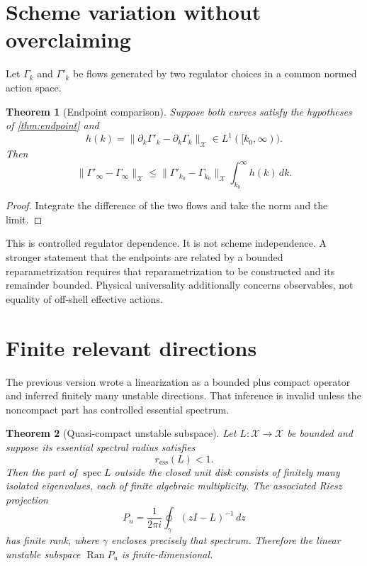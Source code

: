 \documentclass[11pt]{article}
\newtheorem{theorem}{Theorem}[section]
\theoremstyle{definition}
\theoremstyle{remark}
\newcommand{\X}{\mathcal X}
\newcommand{\Id}{I}
\newcommand{\spec}{\operatorname{spec}}
\newcommand{\Ran}{\operatorname{Ran}}
\begin{document}
\section{Scheme variation without overclaiming}

Let \(\Gamma_k\) and \(\Gamma'_k\) be flows generated by two regulator
choices in a common normed action space.

\begin{theorem}[Endpoint comparison]
\label{thm:scheme}
Suppose both curves satisfy the hypotheses of \autoref{thm:endpoint} and
\[
 h(k)=\|\partial_k\Gamma'_k-\partial_k\Gamma_k\|_{\X}
 \in L^1([k_0,\infty)).
\]
Then
\[
 \|\Gamma'_\infty-\Gamma_\infty\|_{\X}
 \leq
 \|\Gamma'_{k_0}-\Gamma_{k_0}\|_{\X}
 \int_{k_0}^\infty h(k)\,dk.
\]
\end{theorem}

\begin{proof}
Integrate the difference of the two flows and take the norm and the limit.
\end{proof}

This is controlled regulator dependence. It is not scheme independence. A
stronger statement that the endpoints are related by a bounded
reparametrization requires that reparametrization to be constructed and its
remainder bounded. Physical universality additionally concerns observables,
not equality of off-shell effective actions.

\section{Finite relevant directions}

The previous version wrote a linearization as a bounded plus compact
operator and inferred finitely many unstable directions. That inference is
invalid unless the noncompact part has controlled essential spectrum.

\begin{theorem}[Quasi-compact unstable subspace]
\label{thm:quasicompact}
Let \(L:\X\to\X\) be bounded and suppose its essential spectral radius
satisfies
\[
 r_{\mathrm{ess}}(L)<1.
\]
Then the part of \(\spec L\) outside the closed unit disk consists of
finitely many isolated eigenvalues, each of finite algebraic multiplicity.
The associated Riesz projection
\[
 P_u=\frac{1}{2\pi i}\oint_\gamma(z\Id-L)^{-1}\,dz
\]
has finite rank, where \(\gamma\) encloses precisely that spectrum.
Therefore the linear unstable subspace \(\Ran P_u\) is finite-dimensional.
\end{theorem}
\end{document}
